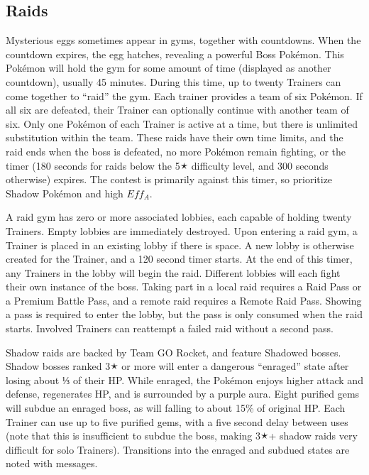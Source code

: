 \subsection{Raids}
\label{sec:raids}
Mysterious eggs sometimes appear in gyms, together with countdowns.
When the countdown expires, the egg hatches, revealing a powerful Boss Pokémon.
This Pokémon will hold the gym for some amount of time (displayed as another countdown), usually 45 minutes.
During this time, up to twenty Trainers can come together to ``raid'' the gym.
Each trainer provides a team of six Pokémon.
If all six are defeated, their Trainer can optionally continue with another team of six.
Only one Pokémon of each Trainer is active at a time, but there is unlimited substitution within the team.
These raids have their own time limits, and the raid ends when the boss is defeated, no more Pokémon remain fighting,
  or the timer (180 seconds for raids below the 5🟉 difficulty level, and 300 seconds otherwise) expires.
The contest is primarily against this timer, so prioritize Shadow Pokémon and high $Eff_A$.

A raid gym has zero or more associated lobbies, each capable of holding twenty Trainers.
Empty lobbies are immediately destroyed.
Upon entering a raid gym, a Trainer is placed in an existing lobby if there is space.
A new lobby is otherwise created for the Trainer, and a 120 second timer starts.
At the end of this timer, any Trainers in the lobby will begin the raid.
Different lobbies will each fight their own instance of the boss.
Taking part in a local raid requires a Raid Pass or a Premium Battle Pass,
  and a remote raid requires a Remote Raid Pass.
Showing a pass is required to enter the lobby, but the pass is only consumed when the raid starts.
Involved Trainers can reattempt a failed raid without a second pass.

Shadow raids are backed by Team GO Rocket, and feature Shadowed bosses.
Shadow bosses ranked 3🟉 or more will enter a dangerous ``enraged'' state after losing about ⅓ of their HP.
While enraged, the Pokémon enjoys higher attack and defense, regenerates HP, and is surrounded by a purple aura.
Eight purified gems will subdue an enraged boss, as will falling to about 15\% of original HP.
Each Trainer can use up to five purified gems, with a five second delay between uses
 (note that this is insufficient to subdue the boss, making 3🟉+ shadow raids
 very difficult for solo Trainers).
Transitions into the enraged and subdued states are noted with messages.

